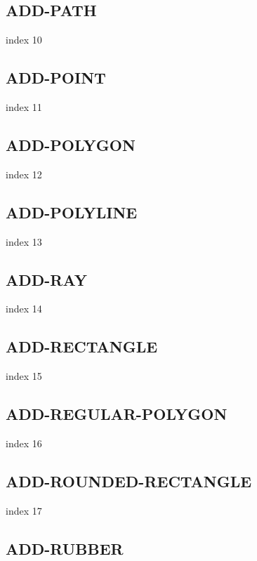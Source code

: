 \documentclass[a4paper]{report}
\begin{document}
\subsection{ADD-PATH}

index 10

\subsection{ADD-POINT}

index 11

\subsection{ADD-POLYGON}

index 12

\subsection{ADD-POLYLINE}

index 13

\subsection{ADD-RAY}

index 14

\subsection{ADD-RECTANGLE}

index 15

\subsection{ADD-REGULAR-POLYGON}

index 16

\subsection{ADD-ROUNDED-RECTANGLE}

index 17

\subsection{ADD-RUBBER}
\end{document}
